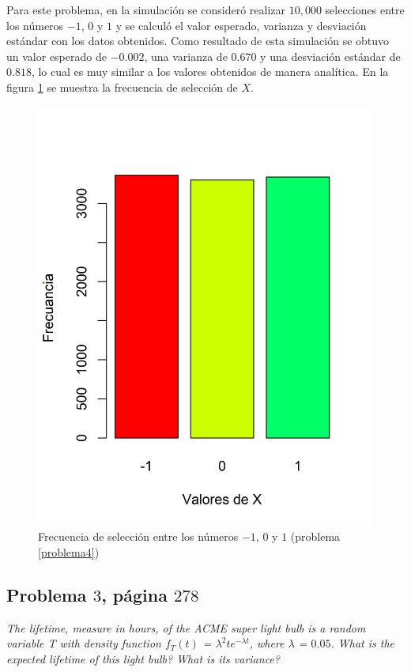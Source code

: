 \documentclass{article}
\begin{document}
Para este problema, en la simulación se consideró realizar $10,000$ selecciones entre los números $-1$, $0$ y $1$ y se calculó el valor esperado, varianza y desviación estándar con los datos obtenidos. Como resultado de esta simulación se obtuvo un valor esperado de $-0.002$, una varianza de $0.670$ y una desviación estándar de $0.818$, lo cual es muy similar a los valores obtenidos de manera analítica. En la figura \ref{seleccion} se muestra la frecuencia de selección de $X$.


\begin{figure}[h]
\centering
    \includegraphics[scale=0.7]{Figures/seleccion.png}
    \caption{Frecuencia de selección entre los números $-1$, $0$ y $1$ (problema \ref{problema4})}
    \label{seleccion}
\end{figure}

\subsection{Problema $3$, página $278$} \label{problema3}
\textit{The lifetime, measure in hours, of the ACME super light bulb is a random variable T with density function $f_{T}(t)$ = $\lambda^2 te^{- \lambda t}$, where $\lambda$ = $0.05$. What is the expected lifetime of this light bulb? What is its variance?}
\end{document}
